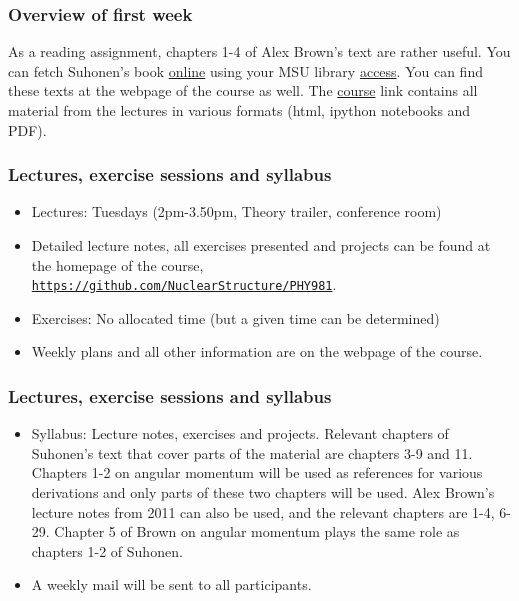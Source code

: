 \documentclass{beamer}
\begin{document}
\begin{frame}
\frametitle{Overview of first week}

\begin{block}{}
As a reading assignment, chapters 1-4 of Alex Brown's text are rather useful.
You can fetch Suhonen's book \href{{http://link.springer.com.proxy2.cl.msu.edu/book/10.1007/978-3-540-48861-3/page/1}}{online} using your MSU library \href{{https://www.lib.msu.edu/general/account/}}{access}.
You can find these texts at the webpage of the course as well.
The \href{{http://nuclearstructure.github.io/PHY981/doc/web/course.html}}{course} link contains 
all material from the lectures in various formats (html, ipython notebooks and PDF).
\end{block}
\end{frame}

\begin{frame}
\frametitle{Lectures, exercise sessions and syllabus}

\begin{block}{}
\begin{itemize}
\item Lectures: Tuesdays (2pm-3.50pm, Theory trailer, conference room)

\item Detailed lecture notes, all exercises presented and projects can be found at the homepage of the course, \href{{https://github.com/NuclearStructure/PHY981}}{\nolinkurl{https://github.com/NuclearStructure/PHY981}}.

\item Exercises: No allocated time (but a given time can be determined)

\item Weekly plans and all other information are on the webpage of the course.
\end{itemize}

\noindent
\end{block}
\end{frame}

\begin{frame}
\frametitle{Lectures, exercise sessions and syllabus}

\begin{block}{}
\begin{itemize}
\item Syllabus: Lecture notes, exercises and projects. Relevant chapters of Suhonen's text that cover parts of the material are chapters 3-9 and 11. Chapters 1-2 on angular momentum will be used as references for various derivations and only parts of these two chapters will be used. Alex Brown's lecture notes from 2011 can also be used, and the relevant chapters are 1-4, 6-29. Chapter 5 of Brown on angular momentum plays the same role as chapters 1-2 of Suhonen. 

\item A weekly mail will be sent to all participants. 
\end{itemize}

\noindent
\end{block}
\end{frame}
\end{document}

